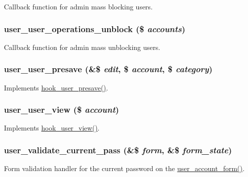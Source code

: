 \label{user_8module_a956597acb38e2078f714d140fe54443c}
Callback function for admin mass blocking users. \hypertarget{user_8module_aea3e4264e414a703905c12725a8fee3f}{
\subsubsection[{user\_\-user\_\-operations\_\-unblock}]{\setlength{\rightskip}{0pt plus 5cm}user\_\-user\_\-operations\_\-unblock (\$ {\em accounts})}}
\label{user_8module_aea3e4264e414a703905c12725a8fee3f}
Callback function for admin mass unblocking users. \hypertarget{user_8module_ab5fa3254072a5402b713090641898e65}{
\subsubsection[{user\_\-user\_\-presave}]{\setlength{\rightskip}{0pt plus 5cm}user\_\-user\_\-presave (\&\$ {\em edit}, \/  \$ {\em account}, \/  \$ {\em category})}}
\label{user_8module_ab5fa3254072a5402b713090641898e65}
Implements \hyperlink{group__hooks_gab6b224c35d7d97259d4350a7849f1e56}{hook\_\-user\_\-presave()}. \hypertarget{user_8module_a81bc32004c6a3e32a3cb0b86875b41d5}{
\subsubsection[{user\_\-user\_\-view}]{\setlength{\rightskip}{0pt plus 5cm}user\_\-user\_\-view (\$ {\em account})}}
\label{user_8module_a81bc32004c6a3e32a3cb0b86875b41d5}
Implements \hyperlink{group__hooks_gaafb9e35d1f82a33918437ad7acf29541}{hook\_\-user\_\-view()}. \hypertarget{user_8module_a129d5503ac6de8cdf01d11b18e2c7298}{
\subsubsection[{user\_\-validate\_\-current\_\-pass}]{\setlength{\rightskip}{0pt plus 5cm}user\_\-validate\_\-current\_\-pass (\&\$ {\em form}, \/  \&\$ {\em form\_\-state})}}
\label{user_8module_a129d5503ac6de8cdf01d11b18e2c7298}
Form validation handler for the current password on the \hyperlink{user_8module_ab51965add9fd8ee2915e65d39213d05c}{user\_\-account\_\-form()}.

